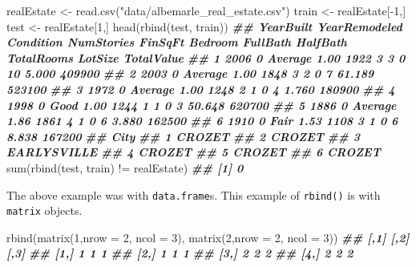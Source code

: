 \documentclass[
  12pt,
  krantz2]{krantz}
\makeatletter
\newenvironment{Shaded}{\begin{snugshade}}{\end{snugshade}}
\newcommand{\AttributeTok}[1]{\textcolor[rgb]{0.61,0.61,0.61}{#1}}
\newcommand{\DecValTok}[1]{\textcolor[rgb]{0.06,0.06,0.06}{#1}}
\newcommand{\DocumentationTok}[1]{\textcolor[rgb]{0.37,0.37,0.37}{\textbf{\textit{#1}}}}
\newcommand{\FunctionTok}[1]{\textcolor[rgb]{0,0,0}{#1}}
\newcommand{\NormalTok}[1]{#1}
\newcommand{\OtherTok}[1]{\textcolor[rgb]{0.37,0.37,0.37}{#1}}
\newcommand{\SpecialCharTok}[1]{\textcolor[rgb]{0,0,0}{#1}}
\newcommand{\StringTok}[1]{\textcolor[rgb]{0.5,0.5,0.5}{#1}}
\newenvironment{kframe}{%
\medskip{}
\setlength{\fboxsep}{.8em}
 \def\at@end@of@kframe{}%
 \ifinner\ifhmode%
  \def\at@end@of@kframe{\end{minipage}}%
  \begin{minipage}{\columnwidth}%
 \fi\fi%
 \def\FrameCommand##1{\hskip\@totalleftmargin \hskip-\fboxsep
 \colorbox{shadecolor}{##1}\hskip-\fboxsep
     \hskip-\linewidth \hskip-\@totalleftmargin \hskip\columnwidth}%
 \MakeFramed {\advance\hsize-\width
   \@totalleftmargin\z@ \linewidth\hsize
   \@setminipage}}%
 {\par\unskip\endMakeFramed%
 \at@end@of@kframe}
\renewenvironment{Shaded}{\begin{kframe}}{\end{kframe}}
\makeatother
\begin{document}
\begin{Shaded}
\begin{Highlighting}[]
\NormalTok{realEstate }\OtherTok{\textless{}{-}} \FunctionTok{read.csv}\NormalTok{(}\StringTok{"data/albemarle\_real\_estate.csv"}\NormalTok{)}
\NormalTok{train }\OtherTok{\textless{}{-}}\NormalTok{ realEstate[}\SpecialCharTok{{-}}\DecValTok{1}\NormalTok{,]}
\NormalTok{test }\OtherTok{\textless{}{-}}\NormalTok{ realEstate[}\DecValTok{1}\NormalTok{,]}
\FunctionTok{head}\NormalTok{(}\FunctionTok{rbind}\NormalTok{(test, train))}
\DocumentationTok{\#\#   YearBuilt YearRemodeled Condition NumStories FinSqFt Bedroom FullBath HalfBath TotalRooms LotSize TotalValue}
\DocumentationTok{\#\# 1      2006             0   Average       1.00    1922       3        3        0         10   5.000     409900}
\DocumentationTok{\#\# 2      2003             0   Average       1.00    1848       3        2        0          7  61.189     523100}
\DocumentationTok{\#\# 3      1972             0   Average       1.00    1248       2        1        0          4   1.760     180900}
\DocumentationTok{\#\# 4      1998             0      Good       1.00    1244       1        1        0          3  50.648     620700}
\DocumentationTok{\#\# 5      1886             0   Average       1.86    1861       4        1        0          6   3.880     162500}
\DocumentationTok{\#\# 6      1910             0      Fair       1.53    1108       3        1        0          6   8.838     167200}
\DocumentationTok{\#\#          City}
\DocumentationTok{\#\# 1      CROZET}
\DocumentationTok{\#\# 2      CROZET}
\DocumentationTok{\#\# 3 EARLYSVILLE}
\DocumentationTok{\#\# 4      CROZET}
\DocumentationTok{\#\# 5      CROZET}
\DocumentationTok{\#\# 6      CROZET}
\FunctionTok{sum}\NormalTok{(}\FunctionTok{rbind}\NormalTok{(test, train) }\SpecialCharTok{!=}\NormalTok{ realEstate)}
\DocumentationTok{\#\# [1] 0}
\end{Highlighting}
\end{Shaded}

The above example was with \texttt{data.frame}s. This example of \texttt{rbind()} is with \texttt{matrix} objects.

\begin{Shaded}
\begin{Highlighting}[]
\FunctionTok{rbind}\NormalTok{(}\FunctionTok{matrix}\NormalTok{(}\DecValTok{1}\NormalTok{,}\AttributeTok{nrow =} \DecValTok{2}\NormalTok{, }\AttributeTok{ncol =} \DecValTok{3}\NormalTok{), }
      \FunctionTok{matrix}\NormalTok{(}\DecValTok{2}\NormalTok{,}\AttributeTok{nrow =} \DecValTok{2}\NormalTok{, }\AttributeTok{ncol =} \DecValTok{3}\NormalTok{))}
\DocumentationTok{\#\#      [,1] [,2] [,3]}
\DocumentationTok{\#\# [1,]    1    1    1}
\DocumentationTok{\#\# [2,]    1    1    1}
\DocumentationTok{\#\# [3,]    2    2    2}
\DocumentationTok{\#\# [4,]    2    2    2}
\end{Highlighting}
\end{Shaded}
\end{document}
